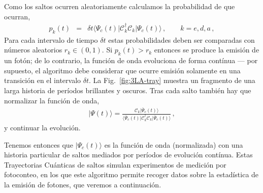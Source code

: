 \documentclass[superscriptaddress,12pt,amsmath]{revtex4-2}
\newcommand{\mcC}{\mathcal{C}}
\providecommand{\bra}[1]{\langle #1 \rvert}
\providecommand{\ket}[1]{\lvert #1 \rangle}
\begin{document}
Como los saltos ocurren aleatoriamente calculamos la probabilidad 
de que ocurran,
%
\begin{eqnarray}
p_k(t) &=& \delta t \bra{\Psi_c (t)} \mcC_k^\dag \mcC_k \ket{\Psi_c (t)} 	\,, 
	\qquad k=e,d,a \,, 
\end{eqnarray}
Para cada intervalo de tiempo $\delta t$ estas probabilidades deben ser 
comparadas con n\'umeros aleatorios $r_k \in (0,1)$. Si $p_k(t) > r_k$ 
entonces se produce la emisi\'on de un fot\'on; de lo contrario, la funci\'on 
de onda evoluciona de forma cont\'inua --- por supuesto, el algoritmo 
debe considerar que ocurre emisi\'on solamente en una transici\'on en el 
intervalo $\delta t$. La Fig.~\ref{fig:3LA-tray} muestra un fragmento de 
una larga historia de per\'iodos brillantes y oscuros. Tras cada salto 
tambi\'en hay que normalizar la funci\'on de onda, 
%
\begin{eqnarray}
|\Psi (t) \rangle = \frac{\mcC_k \ket{\bar{\Psi}_c (t)} }
	{ \bra{\bar{\Psi}_c (t)} \mcC_k^\dag \mcC_k \ket{\bar{\Psi}_c (t)} }  	\,, 
\end{eqnarray}
y continuar la evoluci\'on. 

Tenemos entonces que $\ket{\Psi_c (t)}$ es la funci\'on de onda 
(normalizada) con una historia particular de saltos mediados por 
per\'iodos de evoluci\'on cont\'inua. Estas Trayectorias Cu\'anticas de 
saltos simulan experimentos de medici\'on por fotoconteo, en los que 
este algoritmo permite recoger datos sobre la estad\'istica de la emisi\'on 
de fotones, que veremos a continuaci\'on.

\end{document}
